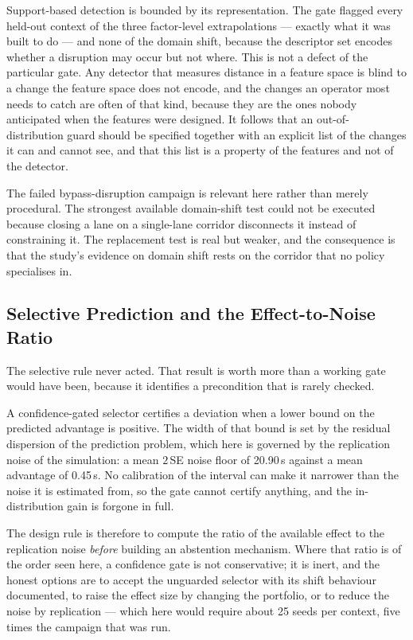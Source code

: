 \documentclass[preprint,12pt]{elsarticle}
\begin{document}
Support-based detection is bounded by its representation. The gate flagged every
held-out context of the three factor-level extrapolations --- exactly what it was
built to do --- and none of the domain shift, because the descriptor set encodes
whether a disruption may occur but not where. This is not a defect of the
particular gate. Any detector that measures distance in a feature space is blind
to a change the feature space does not encode, and the changes an operator most
needs to catch are often of that kind, because they are the ones nobody
anticipated when the features were designed. It follows that an out-of-
distribution guard should be specified together with an explicit list of the
changes it can and cannot see, and that this list is a property of the features
and not of the detector.

The failed bypass-disruption campaign is relevant here rather than merely
procedural. The strongest available domain-shift test could not be executed
because closing a lane on a single-lane corridor disconnects it instead of
constraining it. The replacement test is real but weaker, and the consequence is
that the study's evidence on domain shift rests on the corridor that no policy
specialises in.

\subsection{Selective Prediction and the Effect-to-Noise Ratio}
\label{sec:disc:selective}

The selective rule never acted. That result is worth more than a working gate
would have been, because it identifies a precondition that is rarely checked.

A confidence-gated selector certifies a deviation when a lower bound on the
predicted advantage is positive. The width of that bound is set by the residual
dispersion of the prediction problem, which here is governed by the replication
noise of the simulation: a mean $2\,$SE noise floor of 20.90\,s against a mean
advantage of 0.45\,s. No calibration of the interval can make it narrower than the
noise it is estimated from, so the gate cannot certify anything, and the
in-distribution gain is forgone in full.

The design rule is therefore to compute the ratio of the available effect to the
replication noise \emph{before} building an abstention mechanism. Where that ratio
is of the order seen here, a confidence gate is not conservative; it is inert, and
the honest options are to accept the unguarded selector with its shift behaviour
documented, to raise the effect size by changing the portfolio, or to reduce the
noise by replication --- which here would require about 25 seeds per context, five
times the campaign that was run.
\end{document}
